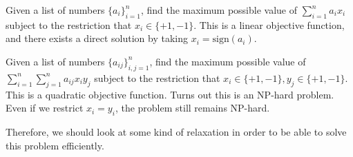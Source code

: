 \documentclass[12pt]{article}
\begin{document}
\begin{example}
    Given a list of numbers $\{ a_i \}_{i=1}^n$, find the maximum possible value of $\sum_{i=1}^n a_i x_i$ subject to the restriction that $x_i \in \{ +1, -1 \}$. This is a linear objective function, and there exists a direct solution by taking $x_i = \text{sign}(a_i)$.
\end{example}

\begin{example}
    Given a list of numbers $\{ a_{ij} \}_{i,j=1}^n$, find the maximum possible value of $\sum_{i=1}^n\sum_{j=1}^n a_{ij} x_iy_j$ subject to the restriction that $x_i \in \{ +1, -1 \}, y_j \in \{ +1, -1\}$. This is a quadratic objective function. Turns out this is an NP-hard problem. Even if we restrict $x_i = y_i$, the problem still remains NP-hard.
\end{example}

Therefore, we should look at some kind of relaxation in order to be able to solve this problem efficiently. 
\end{document}
